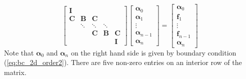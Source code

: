 \documentclass{article}
\begin{document}
\begin{equation*}
    \begin{bmatrix}
    \bm{I} \\
    \bm C & \bm B & \bm C \\
      & \ddots & \ddots & \ddots \\
      &        & \bm C  &  \bm B & \bm C \\
      &        &        &        & \bm I
    \end{bmatrix}
    \begin{bmatrix}
    \bm\alpha_0 \\ \bm\alpha_1 \\ \vdots \\ \bm\alpha_{n-1} \\ \bm\alpha_n 
    \end{bmatrix}
    =
    \begin{bmatrix}
    \bm\alpha_0 \\ \bm f_1 \\ \vdots \\ \bm f_{n-1} \\ \bm\alpha_n
    \end{bmatrix}
\end{equation*}
Note that $\bm\alpha_0$ and $\bm\alpha_n$ on the right hand side is given by boundary condition
(\ref{eq:bc_2d_order2}). There are five non-zero entries on an interior row of the matrix.
\end{document}
